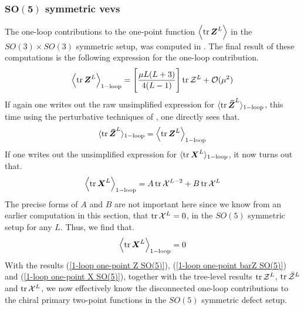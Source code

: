 \subsubsection[$SO(5)$ symmetric vevs]{$\mathbf{SO(5)}$ symmetric vevs}
The one-loop contributions to the one-point function $\expval{\tr \boldsymbol{Z}^{L}}$ in the $SO(3) \times SO(3)$ symmetric setup, was computed in \cite{One-point functions in D3-D7 SO(5)}. The final result of these computations is the following expression for the one-loop contribution.
%
%
\begin{equation}\label{1-loop one-point Z SO(5)}
\expval{\tr \boldsymbol{Z}^{L}}_{\mathrm{1-loop}}
=
\Bigg[
\frac{\mu L (L+3)}{4 (L-1)}
\Bigg]
\tr \mathcal{Z}^{L}
+
\mathcal{O}(\mu^2)
\end{equation}
%
%
If again one writes out the raw unsimplified expression for $\langle \tr \boldsymbol{\bar{Z}}^{L} \rangle_{\mathrm{1-loop}}$, this time using the perturbative techniques of \cite{One-point functions in D3-D7 SO(5)}, one directly sees that.
%
%
\begin{equation}\label{1-loop one-point barZ SO(5)}
\langle \tr \boldsymbol{\bar{Z}}^{L} \rangle_{\mathrm{1-loop}}
=
\expval{\tr \boldsymbol{Z}^{L}}_{\mathrm{1-loop}}
\end{equation}
%
%
If one writes out the unsimplified expression for $\langle \tr \boldsymbol{X}^{L} \rangle_{\mathrm{1-loop}}$, it now turns out that.
%
%
\begin{equation}
\expval{\tr \boldsymbol{X}^{L}}_{\mathrm{1-loop}}
=
A \tr \mathcal{X}^{L-2} + B \tr \mathcal{X}^{L}
\end{equation}
%
%
The precise forms of $A$ and $B$ are not important here since we know from an earlier computation in this section, that $\tr \mathcal{X}^{L} = 0$, in the $SO(5)$ symmetric setup for any $L$. Thus, we find that.
%
%
\begin{equation}\label{1-loop one-point X SO(5)}
\expval{\tr \boldsymbol{X}^{L}}_{\mathrm{1-loop}}
=
0
\end{equation}
%
%
With the results (\ref{1-loop one-point Z SO(5)}), (\ref{1-loop one-point barZ SO(5)}) and (\ref{1-loop one-point X SO(5)}), together with the tree-level results $\tr \mathcal{Z}^L$, $\tr \mathcal{\bar{Z}}^L$ and $\tr \mathcal{X}^L$, we now effectively know the disconnected one-loop contributions to the chiral primary two-point functions in the $SO(5)$ symmetric defect setup.

